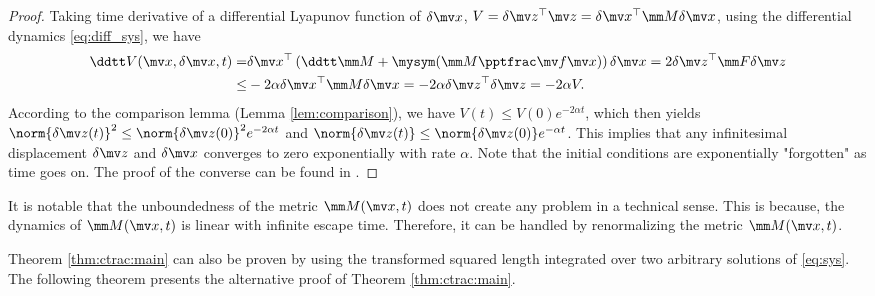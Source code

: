 \begin{proof}
    Taking time derivative of a differential Lyapunov function of $\delta\bdx$, $V=\delta\bdz^\top\bdz=\delta\bdx^\top\mm M\delta\bdx$, using the differential dynamics \eqref{eq:diff_sys}, we have
    \begin{equation}
        \begin{aligned}
            \ddtt V (\bdx, \delta\bdx, t)
            =&
            \delta\bdx^\top
            \left(
                \ddtt\mm M
                +
                \mysym(\mm M\tpfpx)
            \right)
            \delta\bdx
            =
            2
            \delta\bdz^\top
            \mm F
            \delta \bdz
            \\
            \le&
            -2\alpha
            \delta\bdx^\top
            \mm M
            \delta\bdx
            =
            -
            2\alpha
            \delta\bdz^\top
            \delta\bdz
            =
            -2\alpha V
            .
        \end{aligned}
    \end{equation}
    According to the comparison lemma (Lemma \ref{lem:comparison}), we have $V(t)\le V(0)e^{-2\alpha t}$, which then yields $\norm{\delta\bdz(t)}^2\le\norm{\delta\bdz(0)}^2e^{-2\alpha t}$ and $\norm{\delta\bdz(t)}\le\norm{\delta\bdz(0)}e^{-\alpha t}$.
    This implies that any infinitesimal displacement $\delta\bdz$ and $\delta\bdx$ converges to zero exponentially with rate $\alpha$.
    Note that the initial conditions are exponentially "forgotten" as time goes on.
    The proof of the converse can be found in \cite[Sec. 3.5]{LOHMILLER:1998aa}.
\end{proof}

It is notable that the unboundedness of the metric $\mm M(\bdx, t)$ does not create any problem in a technical sense.
This is because, the dynamics of $\mm M(\bdx, t)$ is linear with infinite escape time.
Therefore, it can be handled by renormalizing the metric $\mm M(\bdx, t)$.

\hfill

Theorem \ref{thm:ctrac:main} can also be proven by using the transformed squared length integrated over two arbitrary solutions of \eqref{eq:sys}.
The following theorem presents the alternative proof of Theorem \ref{thm:ctrac:main}.

